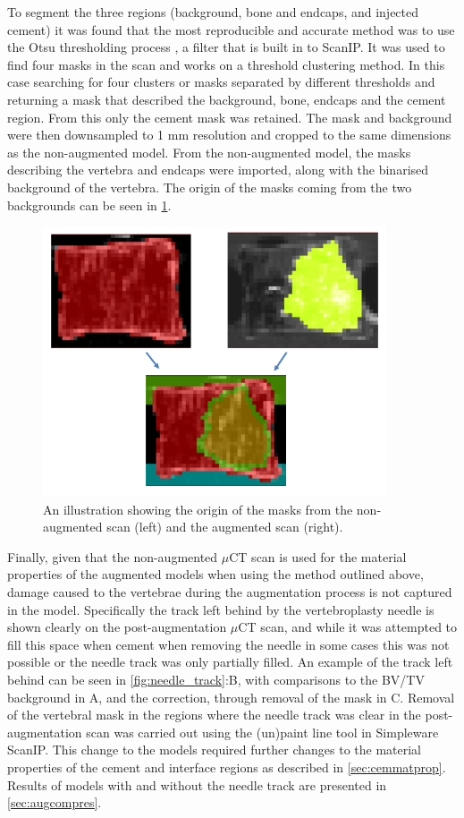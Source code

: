 To segment the three regions (background, bone and endcaps, and injected
cement) it was found that the most reproducible and accurate method was to use
the Otsu thresholding process \cite{sezgin2004survey}, a filter that is built
in to ScanIP\@.
It was used to find four masks in the scan and works on a threshold clustering
method.
In this case searching for four clusters or masks separated by different
thresholds and returning a mask that described the background, bone,
endcaps and the cement region.
From this only the cement mask was retained.
The mask and background were then downsampled to 1 mm resolution and cropped to
the same dimensions as the non-augmented model.
From the non-augmented model, the masks describing the vertebra and endcaps were imported, along with the binarised background of the vertebra.
The origin of the masks coming from the two backgrounds can be seen in
\cref{fig:mask_demo}.

\begin{figure}[ht!]
  \centering
  \includegraphics[width=4in]{Chapters/Chapter_HT_images/mask_demo.png}
  \caption{An illustration showing the origin of the masks from the
non-augmented scan (left) and the augmented scan (right).}
  \label{fig:mask_demo}
\end{figure}

Finally, given that the non-augmented $\mu$CT scan is used for the material
properties of the augmented models when using the method outlined above, damage
caused to the vertebrae during the augmentation process is not captured in the
model. Specifically the track left behind by the vertebroplasty needle is shown
clearly on the post-augmentation $\mu$CT scan, and while it was attempted to
fill this space when cement when removing the needle in some cases this was not
possible or the needle track was only partially filled. An example of the track
left behind can be seen in \cref{fig:needle_track}:B, with comparisons to the
BV/TV background in A, and the correction, through removal of the mask in C.
Removal of the vertebral mask in the regions where the needle track was clear
in the post-augmentation scan was carried out using the (un)paint line tool in
Simpleware ScanIP. This change to the models required further changes to the material
properties of the cement and interface regions as described in
\cref{sec:cemmatprop}. Results of models with and without the needle track are presented in \cref{sec:augcompres}.

